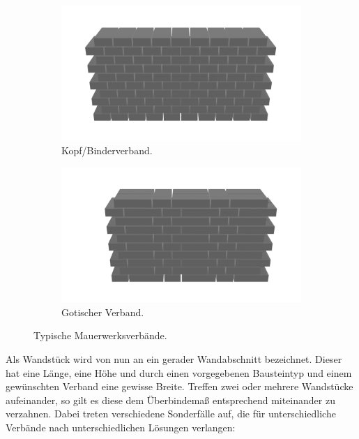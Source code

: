 \begin{figure}[htb]
  \begin{subfigure}[b]{0.5\columnwidth}
    \includegraphics[width=\columnwidth]{fig/kopfverband.png}
    \caption{Kopf/Binderverband.}
    \label{fig:basics:binderverband}
  \end{subfigure}
  \begin{subfigure}[b]{0.5\columnwidth}
    \includegraphics[width=\columnwidth]{fig/gotischerverband.png}
    \caption{Gotischer Verband.}
    \label{fig:basics:gotischer_verband}
  \end{subfigure}
  \caption{Typische Mauerwerksverbände.}
  \label{fig:basics:verbaende}
\end{figure}
Als Wandstück wird von nun an ein gerader Wandabschnitt bezeichnet.
Dieser hat eine Länge, eine Höhe und durch einen vorgegebenen Bausteintyp und einem gewünschten Verband eine gewisse Breite.
Treffen zwei oder mehrere Wandstücke aufeinander, so gilt es diese dem Überbindemaß entsprechend miteinander zu verzahnen.
Dabei treten verschiedene Sonderfälle auf, die für unterschiedliche Verbände nach unterschiedlichen Lösungen verlangen:

